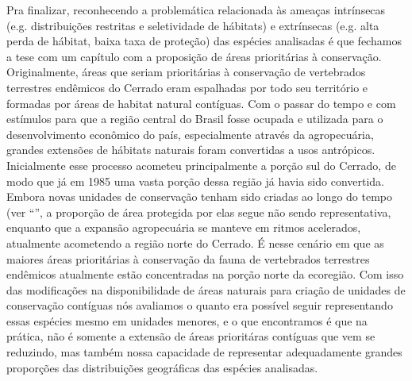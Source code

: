 \documentclass[12pt,openright,oneside,a4paper,english]{abntex2}
\begin{document}
Pra finalizar, reconhecendo a problemática relacionada às ameaças intrínsecas (e.g. distribuições restritas e seletividade de hábitats) e extrínsecas (e.g. alta perda de hábitat, baixa taxa de proteção) das espécies analisadas é que fechamos a tese com um capítulo com a proposição de áreas prioritárias à conservação. Originalmente, áreas que seriam prioritárias à conservação de vertebrados terrestres endêmicos do Cerrado eram espalhadas por todo seu território e formadas por áreas de habitat natural contíguas. Com o passar do tempo e com estímulos para que a região central do Brasil fosse ocupada e utilizada para o desenvolvimento econômico do país, especialmente através da agropecuária, grandes extensões de hábitats naturais foram convertidas a usos antrópicos. Inicialmente esse processo acometeu principalmente a porção sul do Cerrado, de modo que já em 1985 uma vasta porção dessa região já havia sido convertida. Embora novas unidades de conservação tenham sido criadas ao longo do tempo (ver “\textit{}”, a proporção de área protegida por elas segue não sendo representativa, enquanto que a expansão agropecuária se manteve em ritmos acelerados, atualmente acometendo a região norte do Cerrado. É nesse cenário em que as maiores áreas prioritárias à conservação da fauna de vertebrados terrestres endêmicos atualmente estão concentradas na porção norte da ecoregião. Com isso das modificações na disponibilidade de áreas naturais para criação de unidades de conservação contíguas nós avaliamos o quanto era possível seguir representando essas espécies mesmo em unidades menores, e o que encontramos é que na prática, não é somente a extensão de áreas prioritáras contíguas que vem se reduzindo, mas também nossa capacidade de representar adequadamente grandes proporções das distribuições geográficas das espécies analisadas.
\end{document}
